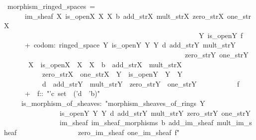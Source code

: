 \documentclass[12pt]{scrartcl}
\begin{document}
\begin{isabelle}
\ morphism\_ringed\_spaces\ =\isanewline
\ \ \ \ \ \ im\_sheaf\ X\ is\_open\isactrlsub X\ \isasymO \isactrlsub X\ \isasymrho \isactrlsub X\ b\ add\_str\isactrlsub X\ mult\_str\isactrlsub X\ zero\_str\isactrlsub X\ one\_str\isactrlsub X\ \isanewline
\ \ \ \ \ \ \ \ \ \ \ \ \ \ \ \ \ \ \ \ \ \ \ \ \ \ \ \ \ \ \ \ \ \ \ \ \ \ \ \ \ \ \ \ \ \ \ \ \ \ \ \ \ \ \ \ Y\ is\_open\isactrlsub Y\ f\ \isanewline
\ \ \ \ \ \ +\ codom:\ ringed\_space\ Y\ is\_open\isactrlsub Y\ \isasymO \isactrlsub Y\ \isasymrho \isactrlsub Y\ d\ add\_str\isactrlsub Y\ mult\_str\isactrlsub Y\ \isanewline
\ \ \ \ \ \ \ \ \ \ \ \ \ \ \ \ \ \ \ \ \ \ \ \ \ \ \ \ \ \ \ \ \ \ \ \ \ \ \ \ \ \ \ \ \ \ \ \ \ \ \ \ zero\_str\isactrlsub Y\ one\_str\isactrlsub Y\isanewline
\ \ \ \ \ \ \ X\ \ is\_open\isactrlsub X\ \ \isasymO \isactrlsub X\ \ \isasymrho \isactrlsub X\ \ b\ \ add\_str\isactrlsub X\ \ mult\_str\isactrlsub X\isanewline
\ \ \ \ \ \ \ \ \ \ \ zero\_str\isactrlsub X\ \ one\_str\isactrlsub X\ \ Y\ \ is\_open\isactrlsub Y\ \ \isasymO \isactrlsub Y\ \ \isasymrho \isactrlsub Y\ \isanewline
\ \ \ \ \ \ \ \ \ \ \ d\ \ add\_str\isactrlsub Y\ \ mult\_str\isactrlsub Y\ \ zero\_str\isactrlsub Y\ \ one\_str\isactrlsub Y\isanewline
\ \ \ \ \ \ \ \ \ \ \ f\ \isanewline
\ \ \ \ \ \ +\ \ \isasymphi \isactrlsub f::\ "'c\ set\ \isasymRightarrow \ ('d\ \isasymRightarrow \ 'b)"\isanewline
\ \ \ \ \ is\_morphism\_of\_sheaves:\ "morphism\_sheaves\_of\_rings\ Y\ \isanewline
\ \ \ \ \ \ \ \ \ \ \ \ \ \ \ \ is\_open\isactrlsub Y\ \isasymO \isactrlsub Y\ \isasymrho \isactrlsub Y\ d\ add\_str\isactrlsub Y\ mult\_str\isactrlsub Y\ zero\_str\isactrlsub Y\ one\_str\isactrlsub Y\isanewline
\ \ \ \ \ \ \ \ \ \ \ \ \ \ \ \ im\_sheaf\ im\_sheaf\_morphisms\ b\ add\_im\_sheaf\ mult\_im\_sheaf\ \isanewline
\ \ \ \ \ \ \ \ \ \ \ \ \ \ \ \ zero\_im\_sheaf\ one\_im\_sheaf\ \isasymphi \isactrlsub f"
\end{isabelle}
\end{document}

